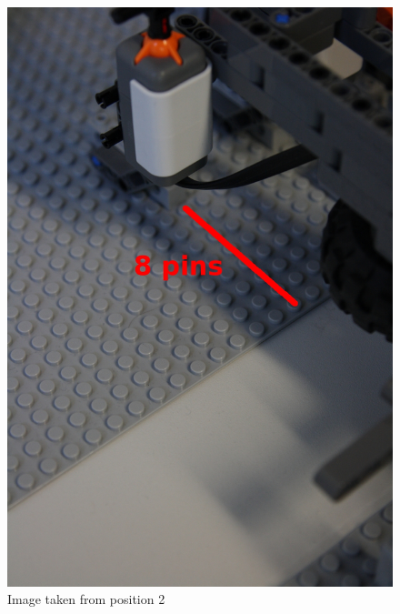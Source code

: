 \documentclass[%
  a4paper,%
  11pt,%
  blue,%
  hyperref	%
  ]{tubsartcl}
\begin{document}
\begin{figure}[!htb]
\begin{center}
\includegraphics[scale=0.4]{graphics/2.jpg}
\end{center}
\caption{Image taken from position 2}
\end{figure}
\end{document}
